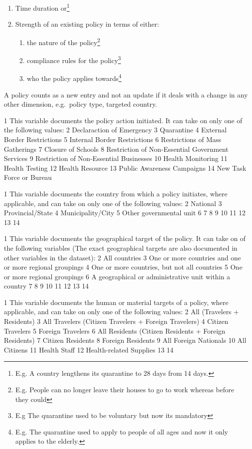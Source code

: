 \documentclass[]{article}
\providecommand{\tightlist}{%
  \setlength{\itemsep}{0pt}\setlength{\parskip}{0pt}}
\let\rmarkdownfootnote\footnote%
\def\footnote{\protect\rmarkdownfootnote}
\begin{document}
\begin{enumerate}
\def\labelenumi{\arabic{enumi}.}
\tightlist
\item
  Time duration or\footnote{E.g. A country lengthens its quarantine to 28 days from 14 days.}
\item
  Strength of an existing policy in terms of either:

  \begin{enumerate}
  \def\labelenumii{\alph{enumii}.}
  \tightlist
  \item
    the nature of the policy\footnote{E.g. People can no longer leave their houses to go to work whereas before they could}
  \item
    compliance rules for the policy\footnote{E.g The quarantine used to be voluntary but now its mandatory}
  \item
    who the policy applies towards\footnote{E.g. The quarantine used to apply to people of all ages and now it only applies to the elderly.}
  \end{enumerate}
\end{enumerate}

A policy counts as a new entry and not an update if it deals with a change in any other dimension, e.g.~policy type, targeted country.

1 This variable documents the policy action initiated. It can take on only one of the following values:
2 Declaraction of Emergency
3 Quarantine
4 External Border Restrictions
5 Internal Border Restrictions
6 Restrictions of Mass Gatherings
7 Closure of Schools
8 Restriction of Non-Essential Government Services
9 Restriction of Non-Essential Businesses
10 Health Monitoring
11 Health Testing
12 Health Resource
13 Public Awareness Campaigns
14 New Task Force or Bureau

1 This variable documents the country from which a policy initiates, where applicable, and can take on only one of the following values:
2 National
3 Provincial/State
4 Municipality/City
5 Other governmental unit
6
7
8
9
10
11
12
13
14

1 This variable documents the geographical target of the policy. It can take on of the following variables (The exact geographical targets are also documented in other variables in the dataset):
2 All countries
3 One or more countries and one or more regional groupings
4 One or more countries, but not all countries
5 One or more regional groupings
6 A geographical or administrative unit within a country
7
8
9
10
11
12
13
14

1 This variable documents the human or material targets of a policy, where applicable, and can take on only one of the following values:
2 All (Travelers + Residents)
3 All Travelers (Citizen Travelers + Foreign Travelers)
4 Citizen Travelers
5 Foreign Travelers
6 All Residents (Citizen Residents + Foreign Residents)
7 Citizen Residents
8 Foreign Residents
9 All Foreign Nationals
10 All Citizens
11 Health Staff
12 Health-related Supplies
13
14
\end{document}
